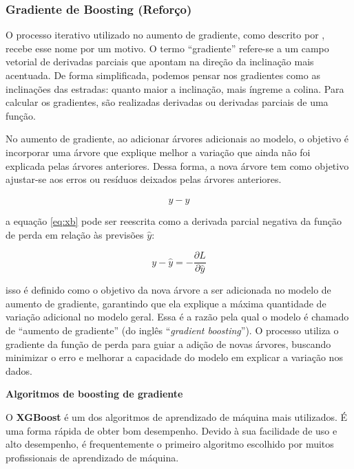\subsubsection{Gradiente de Boosting (Refor\c co)} \label{subsubsec:boosting}

O processo iterativo utilizado no aumento de gradiente, como descrito por , recebe esse nome por um motivo. O termo ``gradiente'' refere-se a um campo vetorial de derivadas parciais que apontam na direção da inclinação mais acentuada. De forma simplificada, podemos pensar nos gradientes como as inclinações das estradas: quanto maior a inclinação, mais íngreme a colina. Para calcular os gradientes, são realizadas derivadas ou derivadas parciais de uma função.

No aumento de gradiente, ao adicionar árvores adicionais ao modelo, o objetivo é incorporar uma árvore que explique melhor a variação que ainda não foi explicada pelas árvores anteriores. Dessa forma, a nova árvore tem como objetivo ajustar-se aos erros ou resíduos deixados pelas árvores anteriores.

\begin{equation}
	y-\hat{y} \label{eq:xb}
\end{equation}

\noindent a equação \eqref{eq:xb} pode ser reescrita como a derivada parcial negativa da função de perda em relação às previsões $\hat{y}$:

\begin{equation}
	y-\hat{y} = -\dfrac{\partial L}{\partial \hat{y}} \label{eq:xb2}
\end{equation}

\noindent isso é definido como o objetivo da nova árvore a ser adicionada no modelo de aumento de gradiente, garantindo que ela explique a máxima quantidade de variação adicional no modelo geral. Essa é a razão pela qual o modelo é chamado de ``aumento de gradiente'' (do inglês ``\textit{gradient boosting}''). O processo utiliza o gradiente da função de perda para guiar a adição de novas árvores, buscando minimizar o erro e melhorar a capacidade do modelo em explicar a variação nos dados.

\noindent\textbf{Algoritmos de boosting de gradiente}

O \textbf{XGBoost} é um dos algoritmos de aprendizado de máquina mais utilizados. É uma forma rápida de obter bom desempenho. Devido à sua facilidade de uso e alto desempenho, é frequentemente o primeiro algoritmo escolhido por muitos profissionais de aprendizado de máquina.

